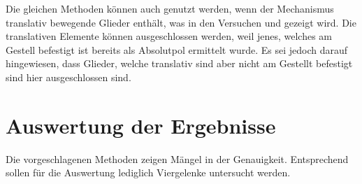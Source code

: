 Die gleichen Methoden können auch genutzt werden, wenn der Mechanismus translativ bewegende Glieder enthält, was in den Versuchen  und  gezeigt wird.
Die translativen Elemente können ausgeschlossen werden, weil jenes, welches am Gestell befestigt ist bereits als Absolutpol ermittelt wurde.
Es sei jedoch darauf hingewiesen, dass Glieder, welche translativ sind aber nicht am Gestellt befestigt sind hier ausgeschlossen sind.

\section{Auswertung der Ergebnisse}

Die vorgeschlagenen Methoden zeigen Mängel in der Genauigkeit.
Entsprechend sollen für die Auswertung lediglich Viergelenke untersucht werden.

